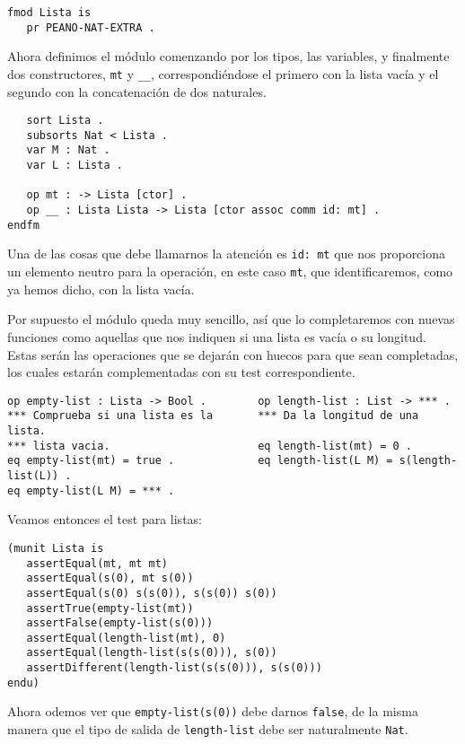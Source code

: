 {\codesize
\begin{verbatim}
fmod Lista is
   pr PEANO-NAT-EXTRA .
\end{verbatim}
}

Ahora definimos el módulo comenzando por los tipos, las variables, y finalmente dos constructores, \verb"mt" y \verb"__", correspondiéndose el primero con la lista vacía y el segundo con la concatenación de dos naturales. \par

{\codesize
\begin{verbatim}
   sort Lista .
   subsorts Nat < Lista .
   var M : Nat .
   var L : Lista .	

   op mt : -> Lista [ctor] .
   op __ : Lista Lista -> Lista [ctor assoc comm id: mt] .
endfm
\end{verbatim}
}

Una de las cosas que debe llamarnos la atención es \verb"id: mt" que nos proporciona un elemento neutro para la operación, en este caso \texttt{mt}, que identificaremos, como ya hemos dicho, con la lista vacía. \par

Por supuesto el módulo queda muy sencillo, así que lo completaremos con nuevas funciones como aquellas que nos indiquen si una lista es vacía o su longitud. Estas serán las operaciones que  se dejarán con huecos para que sean completadas, los cuales estarán complementadas con su test correspondiente. \par

{\codesize
\begin{verbatim}
op empty-list : Lista -> Bool .        op length-list : List -> *** .
*** Comprueba si una lista es la       *** Da la longitud de una lista.
*** lista vacia.                       eq length-list(mt) = 0 .
eq empty-list(mt) = true .             eq length-list(L M) = s(length-list(L)) .                    
eq empty-list(L M) = *** .                        
\end{verbatim}
}

Veamos entonces el test para listas: \par

\begin{verbatim}
(munit Lista is
   assertEqual(mt, mt mt)
   assertEqual(s(0), mt s(0))
   assertEqual(s(0) s(s(0)), s(s(0)) s(0))
   assertTrue(empty-list(mt))
   assertFalse(empty-list(s(0)))
   assertEqual(length-list(mt), 0)
   assertEqual(length-list(s(s(0))), s(0))
   assertDifferent(length-list(s(s(0))), s(s(0)))
endu)
\end{verbatim}

Ahora odemos ver que \verb"empty-list(s(0))" debe darnos \texttt{false}, de la misma manera que el tipo de salida de \verb"length-list" debe ser naturalmente \texttt{Nat}.\par 




